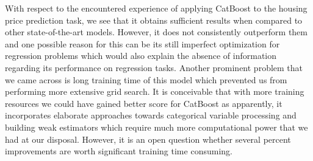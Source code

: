 With respect to the encountered experience of applying CatBoost to the housing price prediction task, we see that it obtains sufficient results when compared to other state-of-the-art models. However, it does not consistently outperform them and one possible reason for this can be its still imperfect optimization for regression problems which would also explain the absence of information regarding its performance on regression tasks. Another prominent problem that we came across is long training time of this model which prevented us from performing more extensive grid search. It is conceivable that with more training resources we could have gained better score for CatBoost as apparently, it incorporates elaborate approaches towards categorical variable processing and building weak estimators which require much more computational power that we had at our disposal. However, it is an open question whether several percent improvements are worth significant training time consuming.